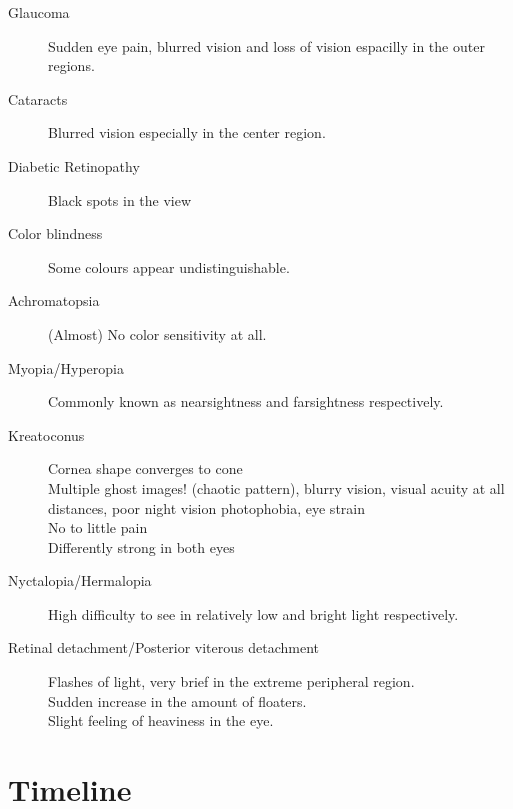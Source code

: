 \documentclass{acm_proc_article-sp}
\newcommand{\todo}[1]{\textcolor{Red}{#1}}
\begin{document}
\begin{description}
    \item[Glaucoma]
        Sudden eye pain, blurred vision and loss of vision espacilly in the outer regions.
    \item[Cataracts]
        Blurred vision especially in the center region.

    \item[Diabetic Retinopathy]
        Black spots in the view

    \item[Color blindness]
        Some colours appear undistinguishable.

    \item[Achromatopsia]
        (Almost) No color sensitivity at all.

    \item[Myopia/Hyperopia]
        Commonly known as nearsightness and farsightness respectively.

    \item[Kreatoconus]
        Cornea shape converges to cone \\
        Multiple ghost images! (chaotic pattern),
        blurry vision, visual acuity at all distances, poor night vision
        photophobia, eye strain \\
        No to little pain \\
        Differently strong in both eyes

    \item[Nyctalopia/Hermalopia]
        High difficulty to see in relatively low and bright light respectively.

    \item[Retinal detachment/Posterior viterous detachment]
        Flashes of light, very brief in the extreme peripheral region.\\
        Sudden increase in the amount of floaters. \\
        Slight feeling of heaviness in the eye.

\end{description}

\section{Timeline}
\todo{}
\printbibliography

\balancecolumns
\end{document}
